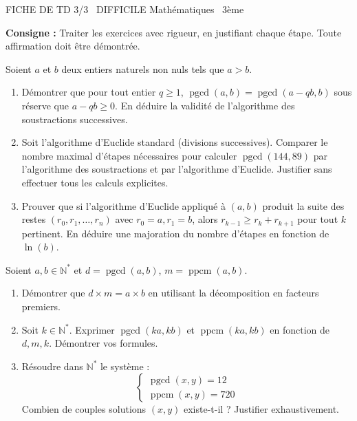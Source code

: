 \documentclass[11pt]{article}
\begin{document}
\begin{tcolorbox}[enhanced,colback=popink,colframe=popink,arc=10pt,boxrule=0pt,left=12pt,right=12pt,top=9pt,bottom=9pt]
{\color{white}\popxbold\small FICHE DE TD 3/3 \textbullet\ DIFFICILE \hfill Mathématiques \textbullet\ 3ème\par}
\end{tcolorbox}
\vspace{4pt}
\noindent\textbf{Consigne :} Traiter les exercices avec rigueur, en justifiant chaque étape. Toute affirmation doit être démontrée.

\begin{exercice}
Soient $a$ et $b$ deux entiers naturels non nuls tels que $a > b$.
\newcommand{\pgcd}{\operatorname{pgcd}}
\begin{enumerate}
    \item Démontrer que pour tout entier $q \ge 1$, $\pgcd(a, b) = \pgcd(a - qb, b)$ sous réserve que $a - qb \ge 0$. En déduire la validité de l'algorithme des soustractions successives.
    \item Soit l'algorithme d'Euclide standard (divisions successives). Comparer le nombre maximal d'étapes nécessaires pour calculer $\pgcd(144, 89)$ par l'algorithme des soustractions et par l'algorithme d'Euclide. Justifier sans effectuer tous les calculs explicites.
    \item Prouver que si l'algorithme d'Euclide appliqué à $(a, b)$ produit la suite des restes $(r_0, r_1, \dots, r_n)$ avec $r_0 = a, r_1 = b$, alors $r_{k-1} \ge r_k + r_{k+1}$ pour tout $k$ pertinent. En déduire une majoration du nombre d'étapes en fonction de $\ln(b)$.
\end{enumerate}
\end{exercice}

\begin{exercice}
Soient $a, b \in \mathbb{N}^*$ et $d = \operatorname{pgcd}(a, b)$, $m = \operatorname{ppcm}(a, b)$.
\begin{enumerate}
    \item Démontrer que $d \times m = a \times b$ en utilisant la décomposition en facteurs premiers.
    \item Soit $k \in \mathbb{N}^*$. Exprimer $\operatorname{pgcd}(ka, kb)$ et $\operatorname{ppcm}(ka, kb)$ en fonction de $d, m, k$. Démontrer vos formules.
    \item Résoudre dans $\mathbb{N}^*$ le système :
    \[
    \begin{cases}
    \operatorname{pgcd}(x, y) = 12 \\
    \operatorname{ppcm}(x, y) = 720
    \end{cases}
    \]
    Combien de couples solutions $(x, y)$ existe-t-il ? Justifier exhaustivement.
\end{enumerate}
\end{exercice}
\end{document}
